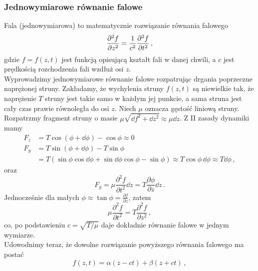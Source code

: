 \documentclass[../main.tex]{subfiles}
\begin{document}
        \subsubsection{Jednowymiarowe równanie falowe}
        Fala (jednowymiarowa) to matematycznie rozwiązanie równania falowego
        \begin{equation*}
            \pdv[2]{f}{z}=\frac{1}{c^2}\pdv[2]{f}{t}\,,
        \end{equation*}
        gdzie \(f=f(z,t)\) jest funkcją opisującą kształt fali w danej chwili, a \(c\) jest prędkością rozchodzenia fali wzdłuż osi \(z\).\\
        Wyprowadzimy jednowymiarowe równanie falowe rozpatrując drgania poprzeczne naprężonej struny. Zakładamy, że wychylenia struny \(f(z,t)\) są niewielkie tak, że naprężenie \(T\) struny jest takie samo w każdym jej punkcie, a sama struna jest cały czas prawie równoległa do osi \(z\). Niech \(\mu\) oznacza gęstość liniową struny. Rozpatrzmy fragment struny o masie \(\mu\sqrt{\dd{f}^2+\dd{z}^2}\approx\mu \dd{z}\). Z II zasady dynamiki mamy
        \begin{equation*}
        \begin{split}
            F_z&=T\cos(\phi+\dd{\phi})-\cos\phi\approx 0\\
            F_y&=T\sin(\phi+\dd{\phi})-T\sin\phi\\
            &=T(\sin\phi\cos \dd{\phi}+\sin \dd{\phi}\cos \phi-\sin \phi)\approx T\cos\phi\,\dd{\phi}\approx T\dd{\phi}\,,
        \end{split}
        \end{equation*}
        oraz
        \begin{equation*}
            F_y=\mu\frac{\partial^2f}{\partial t^2}\dd{z}=T\frac{\partial \phi}{\partial z}\dd{z}\,.
        \end{equation*}
        Jednocześnie dla małych \(\phi\approx \tan\phi =\frac{\partial f}{\partial z}\), zatem
        \begin{equation*}
            \mu\frac{\partial^2f}{\partial t^2} =T\frac{\partial^2f}{\partial z^2}\,,
        \end{equation*}
       co, po podstawieniu \(c=\sqrt{T/\mu}\) daje dokładnie równanie falowe w jednym wymiarze.\\
       Udowodnimy teraz, że dowolne rozwiązanie powyższego równania falowego ma postać
       \begin{equation*}
           f(z,t)=\alpha(z-ct)+\beta(z+ct)\,,
       \end{equation*}
\end{document}
